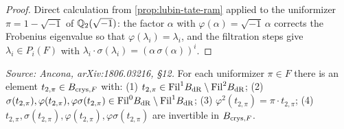 \begin{proof}
  Direct calculation from \cref{prop:lubin-tate-ram} applied to the uniformizer
  \(\pi = 1 - \sqrt{-1}\) of \(\mathbb{Q}_2(\sqrt{-1})\): the factor \(\alpha\) with
  \(\varphi(\alpha) = \sqrt{-1}\,\alpha\) corrects the Frobenius eigenvalue so
  that \(\varphi(\lambda_i) = \lambda_i\), and the filtration steps give
  \(\lambda_i \in P_i(F)\) with \(\lambda_i \cdot \sigma(\lambda_i) = (\alpha\,
  \sigma(\alpha))^i\).
\end{proof}

\begin{proposition}
  \label{prop:idea-ref}
  \textit{Source: Ancona, arXiv:1806.03216, \S12.}
  For each uniformizer \(\pi \in F\) there is an element
  \(t_{2,\pi} \in B_{\mathrm{crys},F}\) with:
  (1) \(t_{2,\pi} \in \mathrm{Fil}^1 B_{\mathrm{dR}} \setminus \mathrm{Fil}^2 B_{\mathrm{dR}}\);
  (2) \(\sigma(t_{2,\pi}), \varphi(t_{2,\pi}), \varphi\sigma(t_{2,\pi}) \in
  \mathrm{Fil}^0 B_{\mathrm{dR}} \setminus \mathrm{Fil}^1 B_{\mathrm{dR}}\);
  (3) \(\varphi^2(t_{2,\pi}) = \pi \cdot t_{2,\pi}\);
  (4) \(t_{2,\pi}, \sigma(t_{2,\pi}), \varphi(t_{2,\pi}), \varphi\sigma(t_{2,\pi})\)
  are invertible in \(B_{\mathrm{crys},F}\).
\end{proposition}

